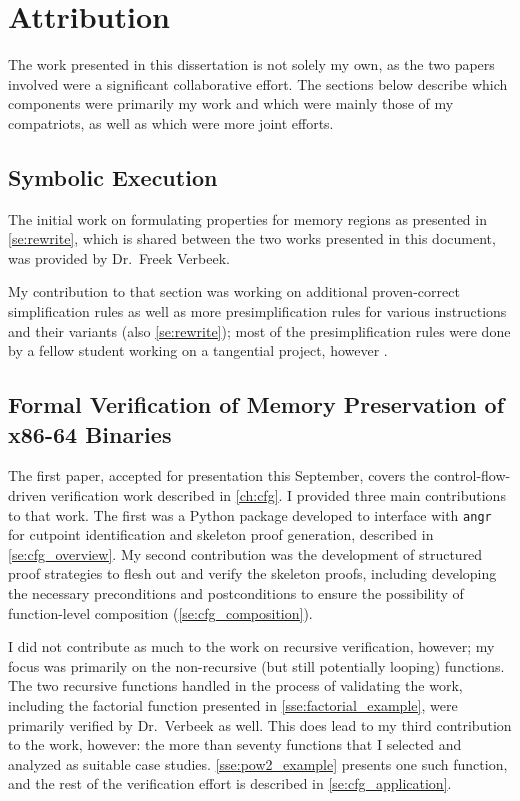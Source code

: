 \chapter{Attribution}\label{attribution}
The work presented in this dissertation is not solely my own,
as the two papers involved were a significant collaborative effort.
The sections below describe which components were primarily my work
and which were mainly those of my compatriots, as well as which were more joint efforts.

\section*{Symbolic Execution}
The initial work on formulating properties for memory regions
as presented in \cref{se:rewrite},
which is shared between the two works presented in this document,
was provided by Dr.~Freek Verbeek.

My contribution to that section was working on additional proven-correct
simplification rules as well as more presimplification rules for
various instructions and their variants (also \cref{se:rewrite});
most of the presimplification rules
were done by a fellow student working on a tangential project,
however \autocite{verbeek2019refinement}.

\section*{Formal Verification of Memory Preservation of x86-64 Binaries}\label{attribute1}
The first paper, accepted for presentation this September,
covers the control-flow-driven verification work described in \cref{ch:cfg}.
I provided three main contributions to that work.
The first was a Python package developed to interface with \texttt{angr}
\autocite{shoshitaishvili2016state}
for cutpoint identification and skeleton proof generation,
described in \cref{se:cfg_overview}.
My second contribution was the development of structured proof strategies
to flesh out and verify the skeleton proofs,
including developing the necessary preconditions and postconditions to ensure
the possibility of function-level composition (\cref{se:cfg_composition}).

I did not contribute as much to the work on recursive verification, however;
my focus was primarily on the non-recursive (but still potentially looping) functions.
The two recursive functions handled in the process of validating the work,
including the factorial function presented in \cref{sse:factorial_example},
were primarily verified by Dr.~Verbeek as well.
This does lead to my third contribution to the work, however:
the more than seventy functions that I selected and analyzed as suitable case studies.
\cref{sse:pow2_example} presents one such function,
and the rest of the verification effort is described in \cref{se:cfg_application}.

